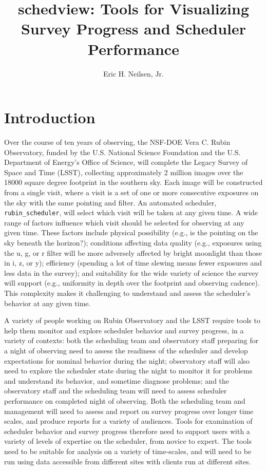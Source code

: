 \documentclass[OPS,lsstdraft,authoryear,toc]{lsstdoc}
\title{schedview: Tools for Visualizing Survey Progress and Scheduler Performance}
\author{Eric H. Neilsen, Jr.}
\date{\vcsDate}
\begin{document}
\maketitle

\section{Introduction} \label{sec:intro}

Over the course of ten years of observing, the NSF-DOE Vera C. Rubin Observatory, funded by the U.S. National Science Foundation and the U.S. Department of Energy's Office of Science, will complete the Legacy Survey of Space and Time (LSST), collecting approximately 2 million images over the 18000 square degree footprint in the southern sky. Each image will be constructed from a single visit, where a visit is a set of one or more consecutive exposures on the sky with the same pointing and filter. An automated scheduler, \texttt{rubin\_scheduler}, will select which visit will be taken at any given time. A wide range of factors influence which visit should be selected for observing at any given time. These factors include physical possibility (e.g., is the pointing on the sky beneath the horizon?); conditions affecting data quality (e.g., exposures using the u, g, or r filter will be more adversely affected by bright moonlight than those in i, z, or y); efficiency (spending a lot of time slewing means fewer exposures and less data in the survey); and suitability for the wide variety of science the survey will support (e.g., uniformity in depth over the footprint and observing cadence). This complexity makes it challenging to understand and assess the scheduler's behavior at any given time.

A variety of people working on Rubin Observatory and the LSST require tools to help them monitor and explore scheduler behavior and survey progress, in a variety of contexts: both the scheduling team and observatory staff preparing for a night of observing need to assess the readiness of the scheduler and develop expectations for nominal behavior during the night; observatory staff will also need to explore the scheduler state during the night to monitor it for problems and understand its behavior, and sometime diagnose problems; and the observatory staff and the scheduling team will need to assess scheduler performance on completed night of observing. Both the scheduling team and management will need to assess and report on survey progress over longer time scales, and produce reports for a variety of audiences. Tools for examination of scheduler behavior and survey progress therefore need to support users with a variety of levels of expertise on the scheduler, from novice to expert. The tools need to be suitable for analysis on a variety of time-scales, and will need to be run using data accessible from different sites with clients run at different sites.
\end{document}
